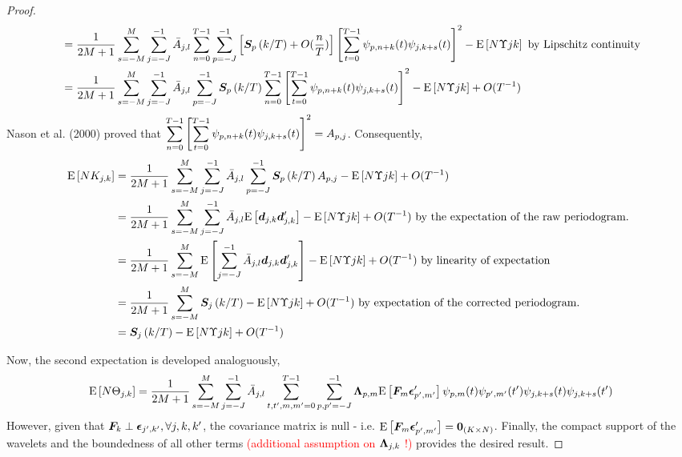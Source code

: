 \documentclass[main_document.tex]{subfiles}
\begin{document}
\begin{proof}
\begin{align*}
							&= \frac{\displaystyle 1}{\displaystyle 2M+1}\sum_{s=-M}^{M} \scalesum{j} \invA{j}{l} \locsum{n} \scalesum{p} \left[\CEWS{p}{k} + O(\frac{n}{T})\right] \left[\locsum{t}\wavelet{p}{n+k}{t}\wavelet{j}{k+s}{t}\right]^{2} - \E{N\Upsilon{j}{k}} \text{ by Lipschitz continuity} \\
							&= \frac{\displaystyle 1}{\displaystyle 2M+1}\sum_{s=-M}^{M} \scalesum{j} \invA{j}{l}  \scalesum{p} \CEWS{p}{k} \locsum{n}\left[\locsum{t}\wavelet{p}{n+k}{t}\wavelet{j}{k+s}{t}\right]^{2} - \E{N\Upsilon{j}{k}} + O(T^{-1})
		\end{align*}
		Nason et al. (2000) proved that $\locsum{n}\left[\locsum{t}\wavelet{p}{n+k}{t}\wavelet{j}{k+s}{t}\right]^{2} = A_{p,j}$. Consequently, 
		\begin{align*}
			\E{N K_{j,k}} &= \frac{\displaystyle 1}{\displaystyle 2M+1}\sum_{s=-M}^{M} \scalesum{j} \invA{j}{l}  \scalesum{p} \CEWS{p}{k} A_{p,j} - \E{N\Upsilon{j}{k}} + O(T^{-1}) \\
						&= \frac{\displaystyle 1}{\displaystyle 2M+1}\sum_{s=-M}^{M} \scalesum{j} \invA{j}{l}  \E{\coeffs{j}{k}\coeffs{j}{k}'} - \E{N\Upsilon{j}{k}} + O(T^{-1}) \text{ by the expectation of the raw periodogram. }\\
						&= \frac{\displaystyle 1}{\displaystyle 2M+1}\sum_{s=-M}^{M} \E{\scalesum{j} \invA{j}{l} \coeffs{j}{k}\coeffs{j}{k}'} - \E{N\Upsilon{j}{k}} + O(T^{-1}) \text{ by linearity of expectation}\\
						&= \frac{\displaystyle 1}{\displaystyle 2M+1}\sum_{s=-M}^{M} \CEWS{j}{k} - \E{N\Upsilon{j}{k}} + O(T^{-1}) \text{ by expectation of the corrected periodogram.}\\
						&= \CEWS{j}{k} - \E{N\Upsilon{j}{k}} + O(T^{-1}) 
		\end{align*}

		Now, the second expectation is developed analoguously,
		\begin{align*}
			\E{N \Theta_{j,k}} = \frac{\displaystyle 1}{\displaystyle 2M+1}\sum_{s=-M}^{M} \scalesum{j} \invA{j}{l} \locsum{t,t',m,m'} \scalesum{p,p'} \loadings{p}{m} \E{\factors{m}\idioError{p'}{m'}'} \wavelet{p}{m}{t}\wavelet{p'}{m'}{t'}\wavelet{j}{k+s}{t}\wavelet{j}{k+s}{t'}
		\end{align*}
		However, given that $\bm{F}_{k} \perp \bm{\epsilon}_{j',k'}, \forall j,k,k'$, the covariance matrix is null - i.e. $\mathrm{E}\left[\bm{F}_{m}\bm{\epsilon}_{p',m'}'\right] = \bm{0}_{(K \times N)}$. Finally, the compact support of the wavelets and the boundedness of all other terms \textcolor{red}{(additional assumption on $\bm{\Lambda}_{j,k}$ !)} provides the desired result. 
	\end{proof}
\end{document}
